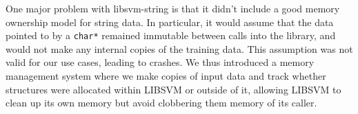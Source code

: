 \documentclass[10pt]{article}
\begin{document}
One major problem with libsvm-string is that it didn't include a good memory ownership model for string data. In particular, it would assume that the data pointed to by a \texttt{char*} remained immutable between calls into the library, and would not make any internal copies of the training data. This assumption was not valid for our use cases, leading to crashes. We thus introduced a memory management system where we make copies of input data and track whether structures were allocated within LIBSVM or outside of it, allowing LIBSVM to clean up its own memory but avoid clobbering them memory of its caller.












\end{document}
